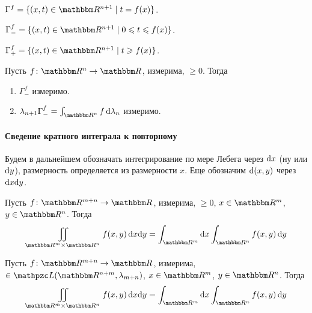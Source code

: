 \documentclass[12pt, timbord]{longnotes}
\begin{document}
\begin{defn}[График]\label{defn:meas::almev::subplot}
  $\Gamma^f = \{ (x,t) \in \R^{n+1} \mid t = f(x)\}$.
\end{defn}
\begin{defn}[Подграфик]\label{defn:meas::almev::subplot}
  $\Gamma_-^f = \{ (x,t) \in \R^{n+1} \mid 0 \leqslant t \leqslant f(x)\}$.
\end{defn}
\begin{defn}[Надграфик]\label{defn:meas::almev::subplot}
  $\Gamma_+^f = \{ (x,t) \in \R^{n+1} \mid t \geqslant f(x)\}$.
\end{defn}

\begin{thrm}\label{thrm:meas::almev::geomsense}
  Пусть $f\colon \R^n \to \R$, измерима, $ \geqslant 0$. Тогда
  \begin{enumerate}
    \item $\Gamma_-^f$ измеримо.
    \item $\lambda_{n+1}\Gamma_-^f = \int_{\R^n} f\, \del \lambda_n$ измеримо.
  \end{enumerate}
\end{thrm}

\paragraph{Сведение кратного интеграла к повторному}
\label{par:meas::mult}

Будем в дальнейшем обозначать интегрирование по мере Лебега через $\mathrm{d} x$ (ну или
$\mathrm{d} y$), размерность определяется из размерности $x$. Еще обозначим $\mathrm{d} (x,y)$ через
$\mathrm{d} x\mathrm{d} y$.

\begin{thrm}[Тонелли]\label{thrm:meas::mult::tonn}
  Пусть $f\colon \R^{m+n} \to \R$, измерима, $ \geqslant 0$, $x\in \R^m$, $y \in \R^n$.
  Тогда
  \[
    \iint_{\R^m \times \R^n} f(x,y) \, \del x\del y 
    = \int_{\R^m} \del x \int_{\R^n} f(x,y) \, \del y
  \]
\end{thrm}

\begin{thrm}[Фубини]\label{thrm:meas::mult::fub}
  Пусть $f\colon \R^{m+n} \to \R$, измерима, $\in \summb(\R^{n+m}, \lambda_{m+n})$,
  $x\in \R^m$, $y \in \R^n$. Тогда
  \[
    \iint_{\R^m \times \R^n} f(x,y) \, \del x\del y 
    = \int_{\R^m} \del x \int_{\R^n} f(x,y) \, \del y
  \]
\end{thrm}
\end{document}
